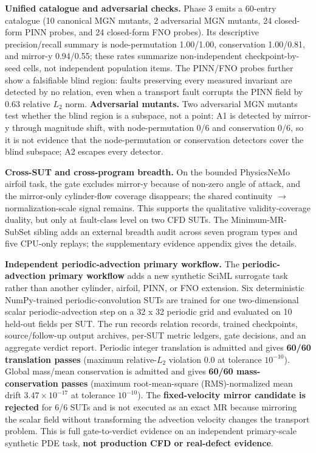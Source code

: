 \documentclass[preprint,12pt,authoryear]{elsarticle}
\begin{document}
\textbf{Unified catalogue and adversarial checks.} Phase 3 emits a 60-entry catalogue (10 canonical MGN mutants, 2 adversarial MGN mutants, 24 closed-form PINN probes, and 24 closed-form FNO probes). Its descriptive precision/recall summary is node-permutation 1.00/1.00, conservation 1.00/0.81, and mirror-y 0.94/0.55; these rates summarize non-independent checkpoint-by-seed cells, not independent population items. The PINN/FNO probes further show a falsifiable blind region: faults preserving every measured invariant are detected by no relation, even when a transport fault corrupts the PINN field by 0.63 relative \(L_2\) norm. \textbf{Adversarial mutants.} Two adversarial MGN mutants test whether the blind region is a subspace, not a point: A1 is detected by mirror-y through magnitude shift, with node-permutation 0/6 and conservation 0/6, so it is not evidence that the node-permutation or conservation detectors cover the blind subspace; A2 escapes every detector.

\textbf{Cross-SUT and cross-program breadth.} On the bounded PhysicsNeMo airfoil task, the gate excludes mirror-y because of non-zero angle of attack, and the mirror-only cylinder-flow coverage disappears; the shared continuity $\to$ normalization-scale signal remains. This supports the qualitative validity-coverage duality, but only at fault-class level on two CFD SUTs. The Minimum-MR-SubSet sibling adds an external breadth audit across seven program types and five CPU-only replays; the supplementary evidence appendix gives the details.

\textbf{Independent periodic-advection primary workflow.} The \textbf{periodic-advection primary workflow} adds a new synthetic SciML surrogate task rather than another cylinder, airfoil, PINN, or FNO extension. Six deterministic NumPy-trained periodic-convolution SUTs are trained for one two-dimensional scalar periodic-advection step on a 32 x 32 periodic grid and evaluated on 10 held-out fields per SUT. The run records relation records, trained checkpoints, source/follow-up output archives, per-SUT metric ledgers, gate decisions, and an aggregate verdict report. Periodic integer translation is admitted and gives \textbf{60/60 translation passes} (maximum relative-\(L_2\) violation 0.0 at tolerance $10^{-10}$). Global mass/mean conservation is admitted and gives \textbf{60/60 mass-conservation passes} (maximum root-mean-square (RMS)-normalized mean drift $3.47\times10^{-17}$ at tolerance $10^{-10}$). The \textbf{fixed-velocity mirror candidate is rejected} for 6/6 SUTs and is not executed as an exact MR because mirroring the scalar field without transforming the advection velocity changes the transport problem. This is full gate-to-verdict evidence on an independent primary-scale synthetic PDE task, \textbf{not production CFD or real-defect evidence}.
\end{document}
